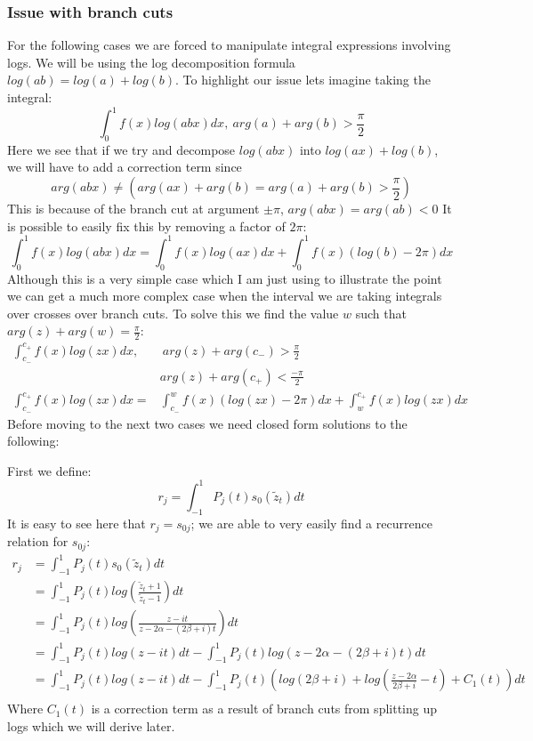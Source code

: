\documentclass{article}
\begin{document}
\subsubsection{Issue with branch cuts}
For the following cases we are forced to manipulate integral expressions involving logs.
We will be using the log decomposition formula $log(ab)=log(a)+log(b)$.
To highlight our issue lets imagine taking the integral:
$$\int_{0}^1 f(x)log(abx)dx,\:arg(a)+arg(b)>\frac{\pi}{2}$$
Here we see that if we try and decompose $log(abx)$ into $log(ax)+log(b)$,
we will have to add a correction term since
$$arg(abx)\neq (arg(ax)+arg(b)=arg(a)+arg(b)>\frac{\pi}{2})$$
This is because of the branch cut at argument $\pm\pi$, $arg(abx)=arg(ab)<0$
It is possible to easily fix this by removing a factor of $2\pi$:
$$\int_{0}^1 f(x)log(abx)dx = \int_{0}^1 f(x)log(ax)dx+\int_{0}^1 f(x)(log(b)-2\pi)dx$$
Although this is a very simple case which I am just using to illustrate the point we can get a much more complex case when the interval we are taking integrals over crosses over branch cuts.
To solve this we find the value $w$ such that $arg(z)+arg(w)=\frac{\pi}{2}$:
\begin{align}
    \int_{c_-}^{c_+}f(x)log(zx)dx,&\:arg(z)+arg(c_-)>\frac{\pi}{2}\\
    &arg(z)+arg(c_+)<\frac{-\pi}{2}\\
    \int_{c_-}^{c_+}f(x)log(zx)dx=&\int_{c_-}^wf(x)(log(zx)-2\pi)dx
    +\int_w^{c_+}f(x)log(zx)dx
\end{align}
Before moving to the next two cases we need closed form solutions to the following:

First we define: $$r_j = \int_{-1}^1P_j(t)s_0(\tilde{z}_t)dt$$
It is easy to see here that $r_j = s_{0j}$; we are able to very easily find a recurrence relation for $s_{0j}$:
\begin{align}
    r_j &= \int_{-1}^1P_j(t)s_0(\tilde{z}_t)dt\\
    &=\int_{-1}^1P_j(t)log(\frac{\tilde{z}_t+1}{\tilde{z}_t-1})dt\\
    &=\int_{-1}^1P_j(t)log(\frac{z-it}{z-2\alpha-(2\beta+i)t})dt\\
    &=\int_{-1}^1P_j(t)log(z-it)dt-\int_{-1}^1P_j(t)log(z-2\alpha-(2\beta+i)t)dt\\
    &=\int_{-1}^1P_j(t)log(z-it)dt
    -\int_{-1}^1P_j(t)(log(2\beta+i)+log(\frac{z-2\alpha}{2\beta+i}-t)+C_1(t))dt\\
\end{align}
Where $C_1(t)$ is a correction term as a result of branch cuts from splitting up logs which we will derive later.
\end{document}
